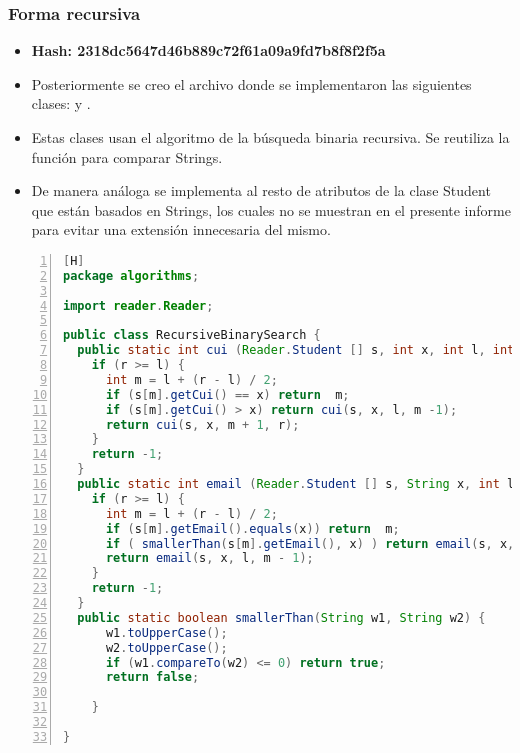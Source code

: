 \subsubsection{Forma recursiva}
  \begin{itemize}
    \item \textbf{Hash: 2318dc5647d46b889c72f61a09a9fd7b8f8f2f5a}
    \item Posteriormente se creo el archivo  donde se implementaron las siguientes clases:  y .
    \item Estas clases usan el algoritmo de la búsqueda binaria recursiva. Se reutiliza la función  para comparar Strings.
    \item De manera análoga se implementa al resto de atributos de la clase Student que están basados en Strings, los cuales no se muestran en el presente informe para evitar una extensión innecesaria del mismo.
  \end{itemize}
  \begin{lstlisting}[language=Java, caption={Commit: Se creó la búsqueda binaria con los métodos de cui y email}, numbers=left, firstnumber=1][H]
package algorithms;

import reader.Reader;

public class RecursiveBinarySearch {
  public static int cui (Reader.Student [] s, int x, int l, int r) {
    if (r >= l) {
      int m = l + (r - l) / 2;
      if (s[m].getCui() == x) return  m;
      if (s[m].getCui() > x) return cui(s, x, l, m -1);
      return cui(s, x, m + 1, r);
    }
    return -1;
  }
  public static int email (Reader.Student [] s, String x, int l, int r) {
    if (r >= l) {
      int m = l + (r - l) / 2;
      if (s[m].getEmail().equals(x)) return  m;
      if ( smallerThan(s[m].getEmail(), x) ) return email(s, x, m + 1, r);
      return email(s, x, l, m - 1);
    }
    return -1;
  }
  public static boolean smallerThan(String w1, String w2) {
      w1.toUpperCase();
      w2.toUpperCase();
      if (w1.compareTo(w2) <= 0) return true;
      return false;

    }

}

  \end{lstlisting}

